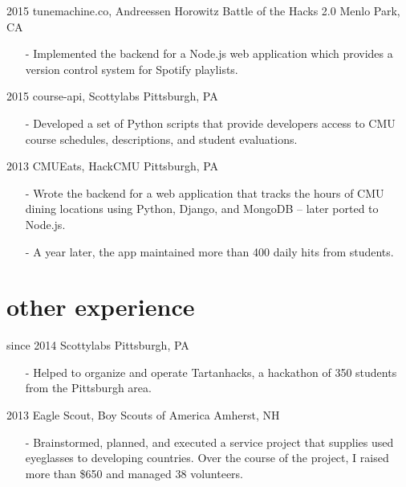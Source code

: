 \documentclass[print]{friggeri-cv}
\begin{document}
    \begin{entrylist}
        \entrys
            {2015}
            {tunemachine.co, {\normalfont Andreessen Horowitz Battle of the Hacks 2.0}}
            {Menlo Park, CA}
            {\begin{itemize}[leftmargin=*]
                \item[-] Implemented the backend for a Node.js web application which provides a version control system for Spotify playlists.
            \end{itemize}}
        \entrys
            {2015}
            {course-api, {\normalfont Scottylabs}}
            {Pittsburgh, PA}
            {\begin{itemize}[leftmargin=*]
                \item[-] Developed a set of Python scripts that provide developers access to CMU course schedules, descriptions, and student evaluations.
            \end{itemize}}
        \entrys
            {2013}
            {CMUEats, {\normalfont HackCMU}}
            {Pittsburgh, PA}
            {\begin{itemize}[leftmargin=*]
                \item[-] Wrote the backend for a web application that tracks the hours of CMU dining locations using Python, Django, and MongoDB -- later ported to Node.js.
                \item[-] A year later, the app maintained more than 400 daily hits from students.
            \end{itemize}}
    \end{entrylist}

    \section{other experience}

    \begin{entrylist}
        \entrys
            {since 2014}
            {Scottylabs}
            {Pittsburgh, PA}
            {\begin{itemize}[leftmargin=*]
                \item[-] Helped to organize and operate Tartanhacks, a hackathon of 350 students from the Pittsburgh area.
            \end{itemize}}
        \entrys
            {2013}
            {Eagle Scout, {\normalfont Boy Scouts of America}}
            {Amherst, NH}
            {\begin{itemize}[leftmargin=*]
                \item[-] Brainstormed, planned, and executed a service project that supplies used eyeglasses to developing countries. Over the course of the project, I raised more than \$650 and managed 38 volunteers.
            \end{itemize}}
    \end{entrylist}
\end{document}
